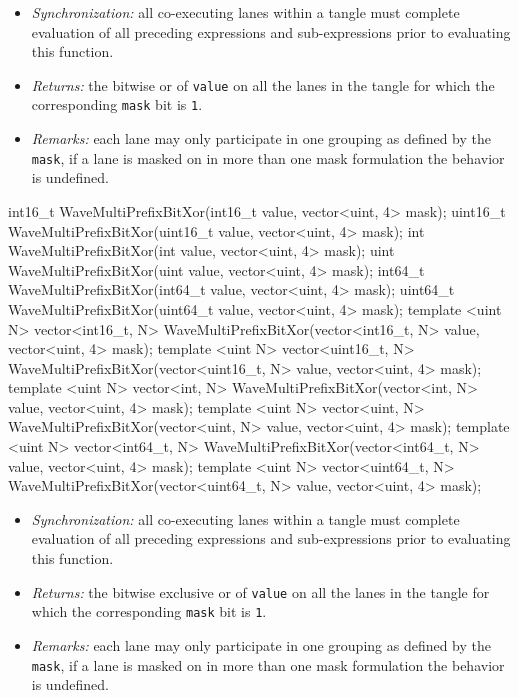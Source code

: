 \begin{itemize}
  \item \textit{Synchronization:} all co-executing \gls{lane}s within a \gls{tangle}
  must complete evaluation of all preceding expressions and sub-expressions
  prior to evaluating this function.
  \item \textit{Returns:} the bitwise or of \texttt{value} on all the
  \gls{lane}s in the \gls{tangle} for which the corresponding \texttt{mask} bit
  is \texttt{1}.
  \item \textit{Remarks:} each \gls{lane} may only participate in one grouping
  as defined by the \texttt{mask}, if a \gls{lane} is masked on in more than one
  mask formulation the behavior is undefined.
\end{itemize}

\begin{HLSL}
int16_t WaveMultiPrefixBitXor(int16_t value, vector<uint, 4> mask);
uint16_t WaveMultiPrefixBitXor(uint16_t value, vector<uint, 4> mask);
int WaveMultiPrefixBitXor(int value, vector<uint, 4> mask);
uint WaveMultiPrefixBitXor(uint value, vector<uint, 4> mask);
int64_t WaveMultiPrefixBitXor(int64_t value, vector<uint, 4> mask);
uint64_t WaveMultiPrefixBitXor(uint64_t value, vector<uint, 4> mask);
template <uint N>
vector<int16_t, N> WaveMultiPrefixBitXor(vector<int16_t, N> value, vector<uint, 4> mask);
template <uint N>
vector<uint16_t, N> WaveMultiPrefixBitXor(vector<uint16_t, N> value, vector<uint, 4> mask);
template <uint N>
vector<int, N> WaveMultiPrefixBitXor(vector<int, N> value, vector<uint, 4> mask);
template <uint N>
vector<uint, N> WaveMultiPrefixBitXor(vector<uint, N> value, vector<uint, 4> mask);
template <uint N>
vector<int64_t, N> WaveMultiPrefixBitXor(vector<int64_t, N> value, vector<uint, 4> mask);
template <uint N>
vector<uint64_t, N> WaveMultiPrefixBitXor(vector<uint64_t, N> value, vector<uint, 4> mask);
\end{HLSL}

\begin{itemize}
  \item \textit{Synchronization:} all co-executing \gls{lane}s within a \gls{tangle}
  must complete evaluation of all preceding expressions and sub-expressions
  prior to evaluating this function.
  \item \textit{Returns:} the bitwise exclusive or of \texttt{value} on all the
  \gls{lane}s in the \gls{tangle} for which the corresponding \texttt{mask} bit
  is \texttt{1}.
  \item \textit{Remarks:} each \gls{lane} may only participate in one grouping
  as defined by the \texttt{mask}, if a \gls{lane} is masked on in more than one
  mask formulation the behavior is undefined.
\end{itemize}

